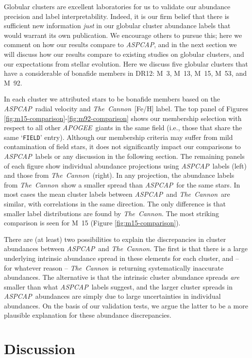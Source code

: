 \documentclass[12pt,preprint]{aastex}
\newcommand{\project}[1]{\textsl{#1}}
\newcommand{\TheCannon}{\project{The~Cannon}}
\newcommand{\acronym}[1]{{\small{#1}}}
\newcommand{\apogee}{\project{\acronym{APOGEE}}}
\newcommand{\aspcap}{\project{\acronym{ASPCAP}}}
\newcommand{\dr}{\acronym{DR12}}
\begin{document}
Globular clusters are excellent laboratories for us to validate
our abundance precision and label interpretability.  Indeed, it is our
firm belief that there is sufficient new information \emph{just} in our
globular cluster abundance labels that would warrant its own publication.
We encourage others to pursue this; here we comment on how our results 
compare to \aspcap, and in the next section we will discuss how our
results compare to existing studies on globular clusters, and our
expectations from stellar evolution.  Here we discuss five globular
clusters that have a considerable of bonafide members in \dr: M~3, M~13,
M~15, M~53, and M~92.  


In each cluster we attributed stars to be bonafide members based on the
\aspcap\ radial velocity and \TheCannon\ [Fe/H] label.  The top panel of
Figures \ref{fig:m15-comparison}-\ref{fig:m92-comparison} shows our 
membership selection with respect to all other \apogee\ giants in the
same field (i.e., those that share the same `\texttt{FIELD}' entry).
Although our membership criteria may suffer from mild contamination of
field stars, it does not significantly impact our comparisons to 
\aspcap\ labels or any discussion in the following section.  The 
remaining panels of each figure show individual abundance projections
using \aspcap\ labels (left) and those from \TheCannon\ (right). 
In any projection, the abundance labels from \TheCannon\ show a smaller
spread than \aspcap\ for the same stars.  In most cases the mean cluster
labels between \aspcap\ and \TheCannon\ are similar, with correlations
in the same direction. The only difference is that smaller label
distributions are found by \TheCannon.  The most striking comparison 
is seen for M~15 (Figure \ref{fig:m15-comparison}).


There are (at least) two possibilities to explain the discrepancies in
cluster abundances between \aspcap\ and \TheCannon.  The first is that
there is a large underlying intrinsic abundance spread in these elements
for each cluster, and -- for whatever reason -- \TheCannon\ is returning
systematically inaccurate abundances.  The alternative is that the
intrinsic cluster abundance spreads \emph{are} smaller than what \aspcap\
labels suggest, and the larger cluster spreads in \aspcap\ abundances are
simply due to large uncertainties in individual abundances.  On the basis
of our validation tests, we argue the latter to be a more plausible
explanation for these abundance discrepancies.


\section{Discussion}
\label{sec:discussion}
\end{document}

